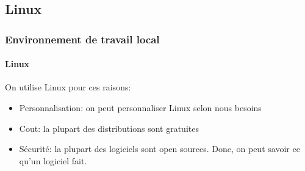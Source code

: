 \documentclass[xcolor=table]{beamer}
\begin{document}
\subsection{Linux}

\begin{frame}
\frametitle{Environnement de travail local}
\framesubtitle{Linux}

On utilise Linux pour ces raisons:
\begin{itemize}
	\item Personnalisation: on peut personnaliser Linux selon nous besoins
	\item Cout: la plupart des distributions sont gratuites
	\item Sécurité: la plupart des logiciels sont open sources. Donc, on peut savoir ce qu'un logiciel fait.
\end{itemize}

\end{frame}
\end{document}
